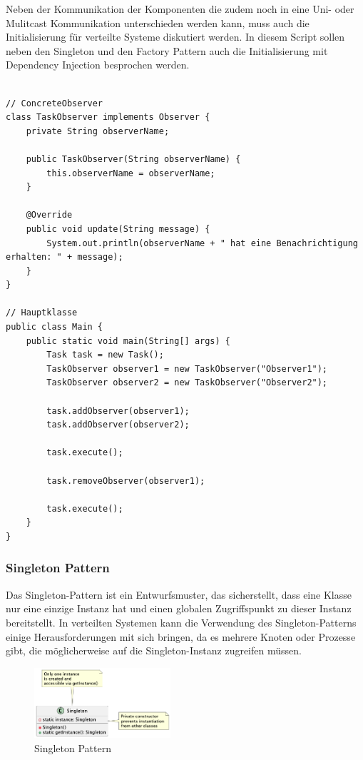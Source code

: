 Neben der Kommunikation der Komponenten die zudem noch in eine Uni- oder Mulitcast Kommunikation unterschieden werden kann, muss auch die Initialisierung für verteilte Systeme diskutiert werden. In diesem Script sollen neben den Singleton und den Factory Pattern auch die Initialisierung mit Dependency Injection besprochen werden.\\\\
\noindent\begin{minipage}{\textwidth}
\begin{lstlisting}[caption={Observer Pattern - Concrete Observer},captionpos=b,label={lst:observer-II}]
// ConcreteObserver
class TaskObserver implements Observer {
    private String observerName;

    public TaskObserver(String observerName) {
        this.observerName = observerName;
    }

    @Override
    public void update(String message) {
        System.out.println(observerName + " hat eine Benachrichtigung erhalten: " + message);
    }
}

// Hauptklasse
public class Main {
    public static void main(String[] args) {
        Task task = new Task();
        TaskObserver observer1 = new TaskObserver("Observer1");
        TaskObserver observer2 = new TaskObserver("Observer2");

        task.addObserver(observer1);
        task.addObserver(observer2);

        task.execute();

        task.removeObserver(observer1);

        task.execute();
    }
}
\end{lstlisting}
\end{minipage}

\subsubsection{Singleton Pattern}

Das Singleton-Pattern ist ein Entwurfsmuster, das sicherstellt, dass eine Klasse nur eine einzige Instanz hat und einen globalen Zugriffspunkt zu dieser Instanz bereitstellt. In verteilten Systemen kann die Verwendung des Singleton-Patterns einige Herausforderungen mit sich bringen, da es mehrere Knoten oder Prozesse gibt, die möglicherweise auf die Singleton-Instanz zugreifen müssen.
\begin{figure}[!ht]
  \centering
  \includegraphics[width=0.45\textwidth]{fig/uml/singleton.png}
  \caption{Singleton Pattern}
  \label{fig:singleton}
\end{figure}

